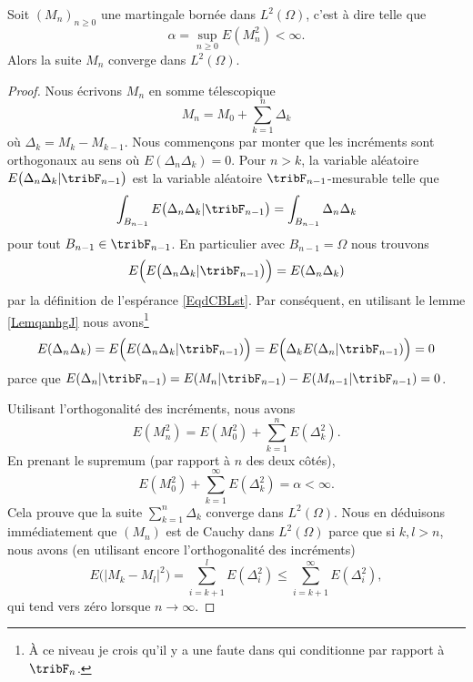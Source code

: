\begin{theorem}     \label{ThobysyWI}
    Soit \( (M_n)_{n\geq 0}\) une martingale bornée dans \( L^2(\Omega)\), c'est à dire telle que
    \begin{equation}
        \alpha=\sup_{n\geq 0}E(M_n^2)<\infty.
    \end{equation}
    Alors la suite \( M_n\) converge dans \( L^2(\Omega)\).
\end{theorem}

\begin{proof}
    Nous écrivons \( M_n\) en somme télescopique
    \begin{equation}
        M_n=M_0+\sum_{k=1}^n\Delta_k
    \end{equation}
    où \( \Delta_k=M_k-M_{k-1}\). Nous commençons par monter que les incréments sont orthogonaux au sens où \( E(\Delta_n\Delta_k)=0\). Pour \( n>k\), la variable aléatoire \( E\big( \Delta_n\Delta_k|\tribF_{n-1} \big)\) est la variable aléatoire \( \tribF_{n-1}\)-mesurable telle que
    \begin{equation}
        \int_{B_{n-1}}E\big( \Delta_n\Delta_k|\tribF_{n-1} \big)=\int_{B_{n-1}}\Delta_n\Delta_k
    \end{equation}
    pour tout \( B_{n-1}\in\tribF_{n-1}\). En particulier avec \( B_{n-1}=\Omega\) nous trouvons
    \begin{equation}
        E\Big( E\big( \Delta_n\Delta_k|\tribF_{n-1} \big)\Big)=E(\Delta_n\Delta_k)
    \end{equation}
    par la définition de l'espérance \eqref{EqdCBLst}. Par conséquent, en utilisant le lemme \ref{LemqanhgJ} nous avons\footnote{À ce niveau je crois qu'il y a une faute dans \cite{PMCmartinLP} qui conditionne par rapport à \( \tribF_n\).}
    \begin{equation}
        E(\Delta_n\Delta_k)=E\Big( E(\Delta_n\Delta_k|\tribF_{n-1}) \Big)=E\Big( \Delta_kE(\Delta_n|\tribF_{n-1}) \Big)=0
    \end{equation}
    parce que \( E(\Delta_n|\tribF_{n-1})=E(M_n|\tribF_{n-1})-E(M_{n-1}|\tribF_{n-1})=0\).

    Utilisant l'orthogonalité des incréments, nous avons
    \begin{equation}
        E(M_n^2)=E(M_0^2)+\sum_{k=1}^nE(\Delta_k^2).
    \end{equation}
    En prenant le supremum (par rapport à \( n\) des deux côtés),
    \begin{equation}
        E(M_0^2)+\sum_{k=1}^{\infty}E(\Delta_k^2)=\alpha<\infty.
    \end{equation}
    Cela prouve que la suite \( \sum_{k=1}^n\Delta_k\) converge dans \( L^2(\Omega)\). Nous en déduisons immédiatement que \( (M_n)\) est de Cauchy dans \( L^2(\Omega)\) parce que si \( k,l>n\), nous avons (en utilisant encore l'orthogonalité des incréments)
    \begin{equation}
        E\big( | M_k-M_l |^2 \big)=\sum_{i=k+1}^lE(\Delta_i^2)\leq\sum_{i=k+1}^{\infty}E(\Delta_i^2),
    \end{equation}
    qui tend vers zéro lorsque \( n\to\infty\).
\end{proof}

